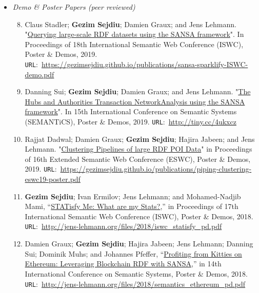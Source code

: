 \begin{itemize}
\begin{enumerate}
\end{enumerate}
    \item \emph{Demo \& Poster Papers (peer reviewed)}
    \begin{enumerate}
    \setcounter{enumi}{7}

    \item Claus Stadler; \textbf{Gezim Sejdiu}; Damien Graux; and Jens Lehmann. "\href{https://gezimsejdiu.github.io/publications/sansa-sparklify-ISWC-demo.pdf}{Querying large-scale RDF datasets using the SANSA framework}".  In Proceedings of 18th International Semantic Web Conference (ISWC), Poster \& Demos, 2019. \texttt{URL}:~\url{https://gezimsejdiu.github.io/publications/sansa-sparklify-ISWC-demo.pdf}

    \item Danning Sui; \textbf{Gezim Sejdiu}; Damien Graux; and Jens Lehmann. "\href{https://gezimsejdiu.github.io/publications/sansa-hubs-and-authorities-transaction-semantics19-poster.pdf}{The Hubs and Authorities Transaction NetworkAnalysis using the SANSA framework}".  In 15th International Conference on Semantic Systems (SEMANTiCS), Poster \& Demos, 2019. \texttt{URL}:~\url{http://tiny.cc/4ukxcz}
    
    \item Rajjat Dadwal; Damien Graux; \textbf{Gezim Sejdiu}; Hajira Jabeen; and Jens Lehmann. "\href{https://gezimsejdiu.github.io/publications/piping-clustering-eswc19-poster.pdf}{Clustering Pipelines of large RDF POI Data}" in Proceedings of 16th Extended Semantic Web Conference (ESWC), Poster \& Demos, 2019. \texttt{URL}:~\url{https://gezimsejdiu.github.io/publications/piping-clustering-eswc19-poster.pdf}
    
    \item \textbf{Gezim Sejdiu}; Ivan Ermilov; Jens Lehmann; and Mohamed-Nadjib Mami, “\href{http://jens-lehmann.org/files/2018/iswc_statisfy_pd.pdf}{STATisfy Me: What are my Stats?},” in Proceedings of 17th International Semantic Web Conference (ISWC), Poster \& Demos, 2018. \texttt{URL}:~\url{http://jens-lehmann.org/files/2018/iswc_statisfy_pd.pdf}
    
    \item Damien Graux; \textbf{Gezim Sejdiu}; Hajira Jabeen; Jens Lehmann; Danning Sui; Dominik Muhs; and Johannes Pfeffer, “\href{http://jens-lehmann.org/files/2018/semantics_ethereum_pd.pdf}{Profiting from Kitties on Ethereum: Leveraging Blockchain RDF with SANSA},” in 14th International Conference on Semantic Systems, Poster \& Demos, 2018. \texttt{URL}:~\url{http://jens-lehmann.org/files/2018/semantics_ethereum_pd.pdf}
    

\end{enumerate}
\end{itemize}
